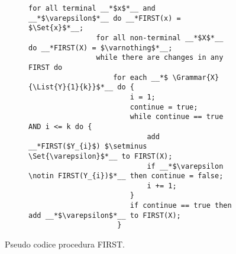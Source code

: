 \documentclass{subfiles}
\begin{document}
\begin{figure}[h!]
    \centering
    \begin{subfigure}[b]{0.7\textwidth}
        \begin{lstlisting}[language = PSEUDO]
                for all terminal __*$x$*__ and __*$\varepsilon$*__ do __*FIRST(x) = $\Set{x}$*__;
                for all non-terminal __*$X$*__ do __*FIRST(X) = $\varnothing$*__;
                while there are changes in any FIRST do
                    for each __*$ \Grammar{X}{\List{Y}{1}{k}}$*__ do {
                        i = 1;
                        continue = true;
                        while continue == true AND i <= k do {
                            add __*FIRST($Y_{i}$) $\setminus \Set{\varepsilon}$*__ to FIRST(X);
                            if __*$\varepsilon \notin FIRST(Y_{i})$*__ then continue = false;
                            i += 1;
                        }
                        if continue == true then add __*$\varepsilon$*__ to FIRST(X);
                     }
            \end{lstlisting}
    \end{subfigure}
    \caption{Pseudo codice procedura FIRST.}
    \label{fig:3}
\end{figure}
\end{document}
